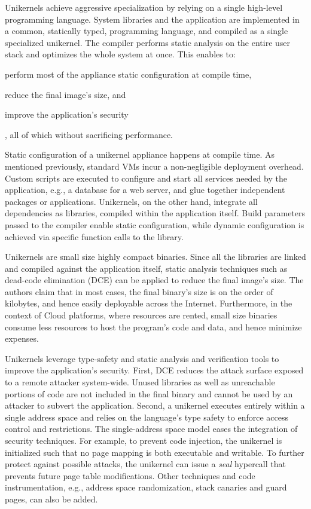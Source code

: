 Unikernels achieve aggressive specialization by relying on a single high-level programming language.
System libraries and the application are implemented in a common, statically typed, programming language, and compiled as a single specialized unikernel.
The compiler performs static analysis on the entire user stack and optimizes the whole system at once.
This enables to:
\begin{enumerate*}
	\item perform most of the appliance static configuration at compile time,
	\item reduce the final image's size, and
	\item improve the application's security
\end{enumerate*}, all of which without sacrificing performance.

Static configuration of a unikernel appliance happens at compile time.
As mentioned previously, standard VMs incur a non-negligible deployment overhead.
Custom scripts are executed to configure and start all services needed by the application, e.g., a database for a web server, and glue together independent packages or applications.
Unikernels, on the other hand, integrate all dependencies as libraries, compiled within the application itself.
Build parameters passed to the compiler enable static configuration, while dynamic configuration is achieved via specific function calls to the library.

Unikernels are small size highly compact binaries.
Since all the libraries are linked and compiled against the application itself, static analysis techniques such as dead-code elimination (DCE) can be applied to reduce the final image's size.
The authors claim that in most cases, the final binary's size is on the order of kilobytes, and hence easily deployable across the Internet.
Furthermore, in the context of Cloud platforms, where resources are rented, small size binaries consume less resources to host the program's code and data, and hence minimize expenses.

Unikernels leverage type-safety and static analysis and verification tools to improve the application's security.
First, DCE reduces the attack surface exposed to a remote attacker system-wide.
Unused libraries as well as unreachable portions of code are not included in the final binary and cannot be used by an attacker to subvert the application.
Second, a unikernel executes entirely within a single address space and relies on the language's type safety to enforce access control and restrictions.
The single-address space model eases the integration of security techniques. 
For example, to prevent code injection, the unikernel is initialized such that no page mapping is both executable and writable.
To further protect against possible attacks, the unikernel can issue a \emph{seal} hypercall that prevents future page table modifications.
Other techniques and code instrumentation, e.g., address space randomization, stack canaries and guard pages, can also be added.

